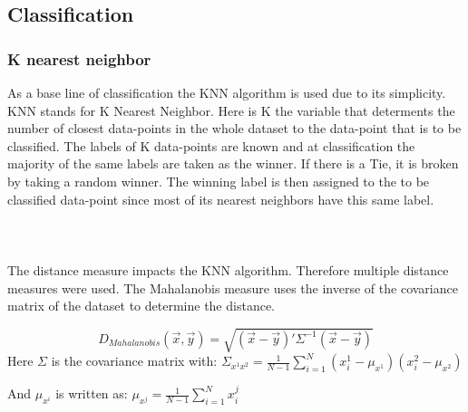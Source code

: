 


\subsection{Classification}

\subsubsection{K nearest neighbor}

As a base line of classification the KNN algorithm is used due to its simplicity. KNN stands for K Nearest Neighbor. Here is K the variable that determents the number of closest data-points in the whole dataset to the data-point that is to be classified. The labels of K data-points are known and at classification the majority of the same labels are taken as the winner. If there is a Tie, it is broken by taking a random winner. The winning label is then assigned to the to be classified data-point since most of its nearest neighbors have this same label.
\\\\
\\\\
The distance measure impacts the KNN algorithm. Therefore multiple distance measures were used. The Mahalanobis measure uses the inverse of the covariance matrix of the dataset to determine the distance.

\begin{equation}
D_{Mahalanobis}(\vec{x},\vec{y}) = \sqrt{(\vec{x}-\vec{y})'\Sigma^{-1}(\vec{x}-\vec{y})} 
\end{equation}
\bigskip
\noindent Here $\Sigma$ is the covariance matrix with: $\Sigma_{x^1x^2} = \frac{1}{N-1} \sum_{i=1}^{N}(x_i^1-\mu_{x^1})(x_i^2-\mu_{x^2})$ 

\noindent And $\mu_{x^i}$ is written as: $\mu_{x^j} = \frac{1}{N-1}\sum_{i=1}^N x_i^j$

